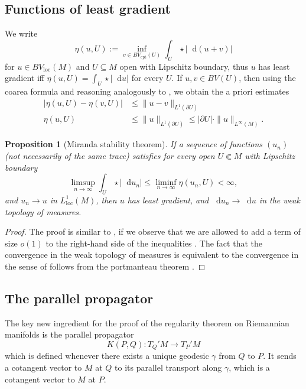 \documentclass[reqno,11pt]{amsart}
\newcommand*\dif{\mathop{}\!\mathrm{d}}
\newcommand{\loc}{\mathrm{loc}}
\newcommand{\cpt}{\mathrm{cpt}}
\newtheorem{proposition}[theorem]{Proposition}
\theoremstyle{definition}
\numberwithin{equation}{section}
\begin{document}
\subsection{Functions of least gradient}
We write
$$\eta(u, U) := \inf_{v \in BV_\cpt(U)} \int_U \star |\dif(u + v)|$$
for $u \in BV_\loc(M)$ and $U \subseteq M$ open with Lipschitz boundary, thus $u$ has least gradient iff $\eta(u, U) = \int_U \star |\dif u|$ for every $U$.
If $u, v \in BV(U)$, then using the coarea formula and reasoning analogously to \cite[Lemma 5.6]{Giusti77}, we obtain the a priori estimates
\begin{align}
|\eta(u, U) - \eta(v, U)| &\leq \|u - v\|_{L^1(\partial U)} \label{a priori estimate 1} \\
\eta(u, U) &\leq \|u\|_{L^1(\partial U)} \leq |\partial U| \cdot \|u\|_{L^\infty(M)}. \label{a priori estimate 2}
\end{align}

\begin{proposition}[Miranda stability theorem]\label{Miranda convergence}
If a sequence of functions $(u_n)$ (not necessarily of the same trace) satisfies for every open $U \Subset M$ with Lipschitz boundary
$$\limsup_{n \to \infty} \int_U \star |\dif u_n| \leq \liminf_{n \to \infty} \eta(u_n, U) < \infty,$$
and $u_n \to u$ in $L^1_\loc(M)$, then $u$ has least gradient, and $\dif u_n \to \dif u$ in the weak topology of measures.
\end{proposition}
\begin{proof}
The proof is similar to \cite[Teorema 3 and Osservazione 3]{Miranda67}, if we observe that we are allowed to add a term of size $o(1)$ to the right-hand side of the inequalities \cite[(2.8), (2.9), (2.13), and (2.14)]{Miranda67}.
The fact that the convergence in the weak topology of measures is equivalent to the convergence in the sense of \cite[Osservazione 3]{Miranda67} follows from the portmanteau theorem \cite[Theorem 13.16]{klenke2013probability}.
\end{proof}

\subsection{The parallel propagator}
The key new ingredient for the proof of the regularity theorem on Riemannian manifolds is the parallel propagator
$$K(P, Q): T_Q'M \to T_P'M$$
which is defined whenever there exists a unique geodesic $\gamma$ from $Q$ to $P$.
It sends a cotangent vector to $M$ at $Q$ to its parallel transport along $\gamma$, which is a cotangent vector to $M$ at $P$.
\end{document}
